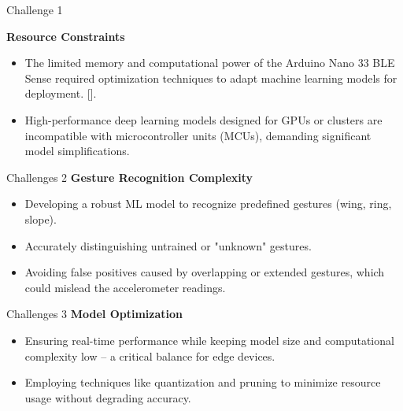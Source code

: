 %
%
%



\begin{frame}{Challenge 1}

\textbf{Resource Constraints}
	
	\begin{itemize}
		
		\item The limited memory and computational power of the Arduino Nano 33 BLE Sense required optimization techniques to adapt machine learning models for deployment. [\cite{Ard:2021}].
		
		\item High-performance deep learning models designed for GPUs or clusters are incompatible with microcontroller units (MCUs), demanding significant model simplifications.
		
	\end{itemize}
	
\end{frame}
	
\begin{frame}{Challenges 2}
\textbf{Gesture Recognition Complexity}

	\begin{itemize}
	
		\item Developing a robust ML model to recognize predefined gestures (wing, ring, slope).
	
		\item Accurately distinguishing untrained or "unknown" gestures.
	
		\item Avoiding false positives caused by overlapping or extended gestures, which could mislead the accelerometer readings.
	
	\end{itemize}
	
\end{frame}

\begin{frame}{Challenges 3}
\textbf{Model Optimization}
	
	\begin{itemize}

		\item Ensuring real-time performance while keeping model size and computational complexity low – a critical balance for edge devices.
	
		\item Employing techniques like quantization and pruning to minimize resource usage without degrading accuracy.

	\end{itemize}
\end{frame}
	
